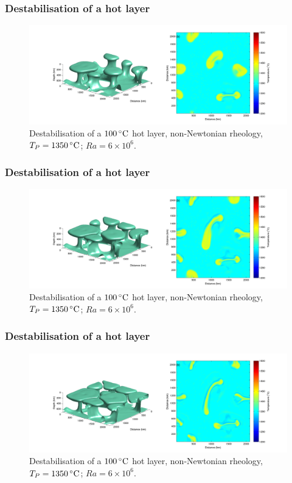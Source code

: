\documentclass[aspectratio=169]{beamer}
\begin{document}
\begin{frame}
    \frametitle{Destabilisation of a hot layer}
    \begin{figure}
        \vspace{-.5cm}
        \includegraphics[width=0.85\paperwidth]{./figures/100hot/100hotbase_4.png}
        \caption{Destabilisation of a $100\rm\,^{\circ}C$ hot layer, non-Newtonian rheology, $T_{P}=1350\rm\,^{\circ}C$; $Ra = 6\times10^{6}$.}
    \end{figure}
\end{frame}

\begin{frame}
    \frametitle{Destabilisation of a hot layer}
    \begin{figure}
        \vspace{-.5cm}
        \includegraphics[width=0.85\paperwidth]{./figures/100hot/100hotbase_5.png}
        \caption{Destabilisation of a $100\rm\,^{\circ}C$ hot layer, non-Newtonian rheology, $T_{P}=1350\rm\,^{\circ}C$; $Ra = 6\times10^{6}$.}
    \end{figure}
\end{frame}

\begin{frame}
    \frametitle{Destabilisation of a hot layer}
    \begin{figure}
        \vspace{-.5cm}
        \includegraphics[width=0.85\paperwidth]{./figures/100hot/100hotbase_6.png}
        \caption{Destabilisation of a $100\rm\,^{\circ}C$ hot layer, non-Newtonian rheology, $T_{P}=1350\rm\,^{\circ}C$; $Ra = 6\times10^{6}$.}
    \end{figure}
\end{frame}
\end{document}
